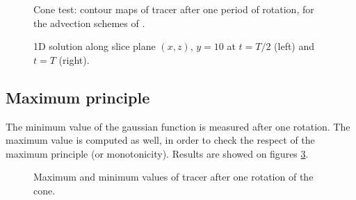 \begin{figure}[H]
\begin{minipage}[t]{0.50\textwidth}
 \centering
\end{minipage}%
\begin{minipage}[t]{0.50\textwidth}
 \centering
\end{minipage}
\begin{minipage}[t]{0.50\textwidth}
 \centering
\end{minipage}%
\begin{minipage}[t]{0.50\textwidth}
 \centering
\end{minipage}
 \caption{Cone test: contour maps of tracer after one period of rotation, for the advection schemes of .}
 \label{t2d:cone:profiles2}
\end{figure}

\begin{figure}[H]
\begin{minipage}[t]{0.50\textwidth}
 \centering
\end{minipage}%
\begin{minipage}[t]{0.50\textwidth}
 \centering
\end{minipage}%
\caption{1D solution along slice plane $(x,z)$, $y=10$ at $t=T/2$ (left) and $t=T$ (right).}
\label{t2d:cone:1dslice}
\end{figure}

\newpage

\subsection{Maximum principle}

The minimum value of the gaussian function is measured after one rotation.
The maximum value is computed as well, in order to check the respect of the maximum principle (or monotonicity).
Results are showed on figures \ref{t2d:cone:minmax}.

\begin{figure}[H]
\centering
{}
\caption{Maximum and minimum values of tracer after one rotation of the cone.}
\label{t2d:cone:minmax}
\end{figure}

